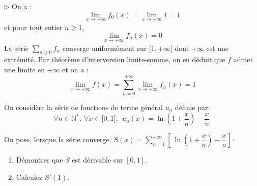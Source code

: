 \documentclass[a4paper,10pt]{report}
\newcommand{\Sum}[2]{\ensuremath{\textstyle{\sum\limits_{#1}^{#2}}}}
\begin{document}
\medskip

\noindent $\rhd$ On a :
$$ \lim_{x \rightarrow + \infty} f_0(x) = \lim_{x \rightarrow + \infty} 1 = 1$$
et pour tout entier $n \geq 1$,
$$ \lim_{x \rightarrow + \infty} f_n(x) = 0$$
La série $\Sum{n\geq 0}{} f_n$ converge uniformément sur $[1, + \infty[$ dont $+ \infty$ est une extrémité. Par théorème d'interversion limite-somme, on en déduit que $f$ admet une limite en $+ \infty$ et on a :
$$ \lim_{x \rightarrow + \infty} f(x) = \sum_{n=0}^{+ \infty} \lim_{x \rightarrow + \infty} f_n(x) = 1$$

\medskip
 

\begin{Exercice}{} On consid\`{e}re la s\'{e}rie de fonctions de terme g\'{e}n\'{e}ral $u_{n}$ d\'{e}finie par: 
\begin{equation*}
\forall n\in \mathbb{N}^{*},\ \forall x\in \lbrack 0,1], \ \ u_{n}\left(x\right) =\ln \left( 1+\dfrac{x}{n}\right) -\dfrac{x}{n}~
\end{equation*}

On pose, lorsque la s\'{e}rie converge, $S(x)=\displaystyle\sum\limits_{n=1}^{+\infty }\left[ \ \ln \left( 1+\dfrac{x}{n}\right) -\dfrac{x}{n}\right] \cdot $

\begin{enumerate}
\item D\'{e}montrer que $S$ est dérivable sur $[0,1]$.
\item Calculez $S'(1)$.
\end{enumerate}
\end{Exercice}

\corr 
\end{document}
